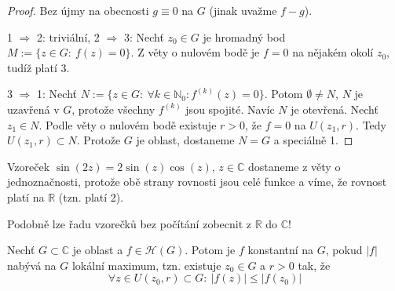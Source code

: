 \begin{proof}
Bez újmy na obecnosti $g \equiv 0$ na $G$ (jinak uvažme $f-g$).

1 $\Rightarrow$ 2: triviální, 2 $\Rightarrow$ 3: Nechť $z_0 \in G$ je hromadný bod $M:=\{z \in G :\ f(z)=0 \}$. Z věty o nulovém bodě je $f=0$ na nějakém okolí $z_0$, tudíž platí 3.

3 $\Rightarrow$ 1: Nechť $N:=\{z \in G: \ \forall k \in \mathbb{N}_0: f^{(k)}(z)=0 \}$. Potom $\emptyset  \neq N$, $N$ je uzavřená v $G$, protože všechny $f^{(k)}$ jsou spojité. Navíc $N$ je otevřená. Nechť $z_1 \in N$. Podle věty o nulovém bodě existuje $r>0$, že $f=0$ na $U(z_1,r)$. Tedy $U(z_1,r) \subset N$. Protože $G$ je oblast, dostaneme $N=G$ a speciálně 1.
\end{proof}

\begin{example}
Vzoreček $\sin (2z)=2\sin (z) \cos (z)$, $z \in \mathbb{C}$ dostaneme z věty o jednoznačnosti, protože obě strany rovnosti jsou celé funkce a víme, že rovnost platí na $\mathbb{R}$ (tzn. platí 2).
\end{example}

\begin{note}
Podobně lze řadu vzorečků bez počítání zobecnit z $\mathbb{R}$ do $\mathbb{C}$!
\end{note}

\begin{theorem}
Nechť $G \subset \mathbb{C}$ je oblast a $f\in \mathcal{H}(G)$. Potom je $f$ konstantní na $G$, pokud $|f|$ nabývá na $G$ lokální maximum, tzn. existuje $z_0 \in G$ a $r>0$ tak, že 
\begin{equation}
    \forall z \in U(z_0,r) \subset G:\ |f(z)| \leq |f(z_0)|
    \label{eqn:6.8.+}
\end{equation}
\end{theorem}

